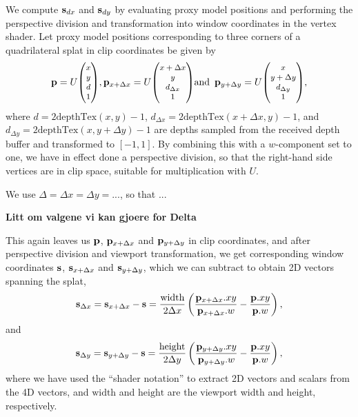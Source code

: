 We compute $\mathbf{s}_{dx}$ and $\mathbf{s}_{dy}$ by evaluating proxy model positions and
performing the perspective division and transformation into window coordinates
in the vertex shader. Let proxy model positions corresponding to three corners
of a quadrilateral splat in clip coordinates be
given by
\[
  \pv =
  U { \small \begin{pmatrix} x \\ y \\ d \\ 1 \end{pmatrix} },
  \pv_{x+\Delta x} =
  U { \small \begin{pmatrix} x+\Delta x \\ y \\ d_{\Delta x} \\ 1 \end{pmatrix} }
  \text{and}\, \, \, 
  \pv_{y+\Delta y} =
  U { \small \begin{pmatrix} x \\ y+\Delta y \\ d_{\Delta y} \\ 1 \end{pmatrix} },
\]
where $d = 2\text{depthTex}(x, y) - 1$, $d_{\Delta x} =
2\text{depthTex}(x+\Delta x, y) - 1$, and $d_{\Delta y} = 2\text{depthTex}(x,
y+\Delta y) - 1$ are depths sampled from the received depth buffer and
transformed to $[-1, 1]$. By combining this with a $w$-component set to one, we
have in effect done a perspective division, so that the right-hand side vertices
are in clip space, suitable for multiplication with $U$.

We use $\Delta = \Delta x = \Delta y = ...$, so that ...

\textbf{ Litt om valgene vi kan gjoere for Delta}

This again leaves us $\mathbf{p}$, $\mathbf{p}_{x+\Delta x}$ and $\mathbf{p}_{y+\Delta y}$ in clip
coordinates, and after perspective division and viewport transformation, we get
corresponding window coordinates $\mathbf{s}$, $\mathbf{s}_{x+\Delta x}$ and $\mathbf{s}_{y+\Delta
y}$, which we can subtract to obtain 2D vectors spanning the splat,
\[
  \mathbf{s}_{\Delta x} =
  \mathbf{s}_{x+\Delta x} - \mathbf{s} =
    \frac{\text{width}}{2\Delta x} \left(
        \frac{\mathbf{p}_{x+\Delta x}.xy}{\mathbf{p}_{x+\Delta x}.w} -
        \frac{\mathbf{p}.xy}{\mathbf{p}.w}
    \right),
\]
and
\[
  \mathbf{s}_{\Delta y} =
  \mathbf{s}_{y+\Delta y} - \mathbf{s} =
    \frac{\text{height}}{2\Delta y} \left(
        \frac{\mathbf{p}_{y+\Delta y}.xy}{\mathbf{p}_{y+\Delta y}.w} -
        \frac{\mathbf{p}.xy}{\mathbf{p}.w}
    \right),
\]
where we have used the ``shader notation'' to extract 2D vectors and scalars
from the 4D vectors, and $\text{width}$ and $\text{height}$ are the viewport
width and height, respectively.

